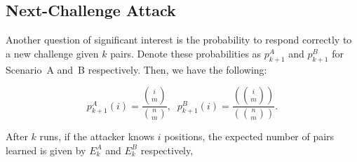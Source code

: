 \documentclass{llncs}
\begin{document}





\subsection{Next-Challenge Attack} \label{sec23}

Another question of significant interest is the probability
to respond correctly to a new challenge given $k$ pairs. Denote
these probabilities as $p^A_{k+1}$ and $p^B_{k+1}$ for Scenario~A and~B respectively. Then, we have the following:

\begin{equation}\label{eqq1}
  p^A_{k+1}(i)=\frac{\binom{i}{m}}{\binom{n}{m}},\;\; p^B_{k+1}(i)=\frac{\left(\!\!{i\choose m}\!\!\right)}{\left(\!\!{n\choose m}\!\!\right)}.
\end{equation}

\noindent After $k$ runs, if the attacker knows $i$ positions, the expected number of pairs learned is given by $E^A_{k}$ and $E^B_{k}$ respectively,
\end{document}
